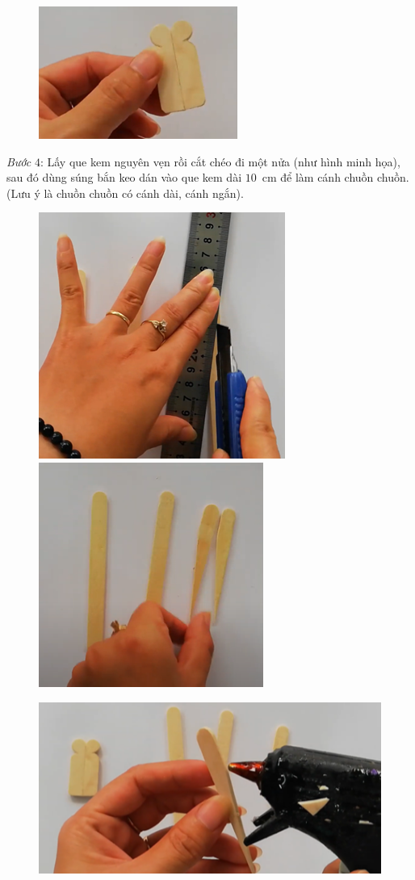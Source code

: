 \begin{multicols}{2}
\begin{figure}[H]
		\vspace*{1pt}
		\hspace*{1pt}\includegraphics[width=0.7\linewidth]{19}
		\vspace*{-10pt}
	\end{figure}
	\textit{Bước} $4$: Lấy que kem nguyên vẹn rồi cắt chéo đi một nửa (như hình minh họa), sau đó dùng súng bắn keo dán vào que kem dài $10$~cm để làm cánh chuồn chuồn. (Lưu ý là chuồn chuồn có cánh dài, cánh ngắn).
	\begin{figure}[H]
		\vspace*{5pt}
		\centering
		\captionsetup{labelformat= empty, justification=centering}
		\includegraphics[height=0.35\linewidth]{50}
		\includegraphics[height=0.35\linewidth]{51}
		
		\vspace*{1pt}
		\includegraphics[width=0.7\linewidth]{52}
		

\end{figure}
\end{multicols}
